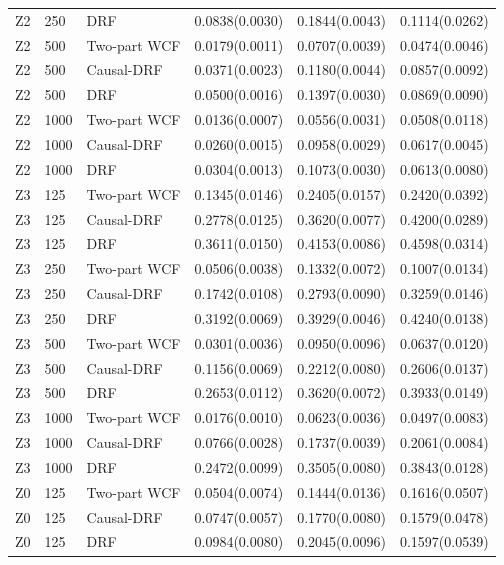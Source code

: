 \begin{longtable}{lllrrr}
Z2 & 250 & DRF & 0.0838(0.0030) & 0.1844(0.0043) & 0.1114(0.0262) \\
\addlinespace
Z2 & 500 & Two-part WCF & 0.0179(0.0011) & 0.0707(0.0039) & 0.0474(0.0046) \\
Z2 & 500 & Causal-DRF & 0.0371(0.0023) & 0.1180(0.0044) & 0.0857(0.0092) \\
Z2 & 500 & DRF & 0.0500(0.0016) & 0.1397(0.0030) & 0.0869(0.0090) \\
\addlinespace
Z2 & 1000 & Two-part WCF & 0.0136(0.0007) & 0.0556(0.0031) & 0.0508(0.0118) \\
Z2 & 1000 & Causal-DRF & 0.0260(0.0015) & 0.0958(0.0029) & 0.0617(0.0045) \\
Z2 & 1000 & DRF & 0.0304(0.0013) & 0.1073(0.0030) & 0.0613(0.0080) \\
\addlinespace
\midrule
Z3 & 125 & Two-part WCF & 0.1345(0.0146) & 0.2405(0.0157) & 0.2420(0.0392) \\
Z3 & 125 & Causal-DRF & 0.2778(0.0125) & 0.3620(0.0077) & 0.4200(0.0289) \\
Z3 & 125 & DRF & 0.3611(0.0150) & 0.4153(0.0086) & 0.4598(0.0314) \\
\addlinespace
Z3 & 250 & Two-part WCF & 0.0506(0.0038) & 0.1332(0.0072) & 0.1007(0.0134) \\
Z3 & 250 & Causal-DRF & 0.1742(0.0108) & 0.2793(0.0090) & 0.3259(0.0146) \\
Z3 & 250 & DRF & 0.3192(0.0069) & 0.3929(0.0046) & 0.4240(0.0138) \\
\addlinespace
Z3 & 500 & Two-part WCF & 0.0301(0.0036) & 0.0950(0.0096) & 0.0637(0.0120) \\
Z3 & 500 & Causal-DRF & 0.1156(0.0069) & 0.2212(0.0080) & 0.2606(0.0137) \\
Z3 & 500 & DRF & 0.2653(0.0112) & 0.3620(0.0072) & 0.3933(0.0149) \\
\addlinespace
Z3 & 1000 & Two-part WCF & 0.0176(0.0010) & 0.0623(0.0036) & 0.0497(0.0083) \\
Z3 & 1000 & Causal-DRF & 0.0766(0.0028) & 0.1737(0.0039) & 0.2061(0.0084) \\
Z3 & 1000 & DRF & 0.2472(0.0099) & 0.3505(0.0080) & 0.3843(0.0128) \\
\addlinespace
\midrule
Z0 & 125 & Two-part WCF & 0.0504(0.0074) & 0.1444(0.0136) & 0.1616(0.0507) \\
Z0 & 125 & Causal-DRF & 0.0747(0.0057) & 0.1770(0.0080) & 0.1579(0.0478) \\
Z0 & 125 & DRF & 0.0984(0.0080) & 0.2045(0.0096) & 0.1597(0.0539) \\

\end{longtable}
